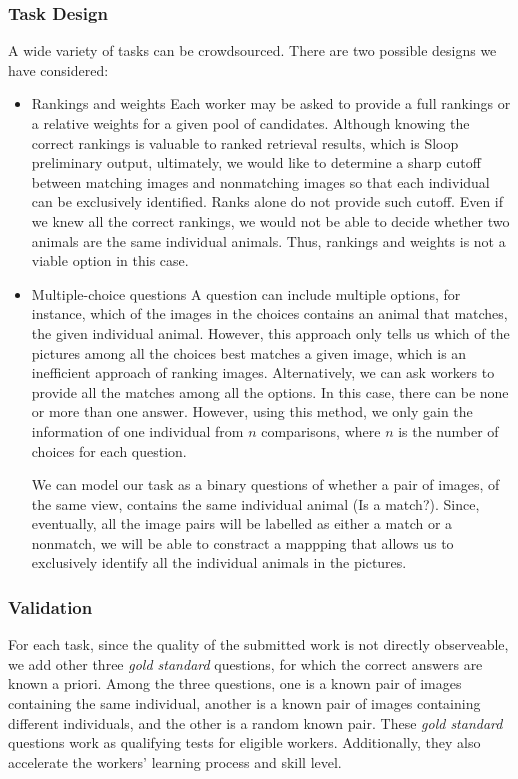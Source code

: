 \subsubsection{Task Design}
A wide variety of tasks can be crowdsourced. There are two possible designs we have considered:
\begin{itemize}
	\item Rankings and weights
	Each worker may be asked to provide a full rankings or a relative weights for a given pool of candidates. Although knowing the correct rankings is valuable to ranked retrieval results, which is Sloop preliminary output, ultimately, we would like to determine a sharp cutoff between matching images and nonmatching images so that each individual can be exclusively identified. Ranks alone do not provide such cutoff. Even if we knew all the correct rankings, we would not be able to decide whether two animals are the same individual animals. Thus, rankings and weights is not a viable option in this case.
	\item Multiple-choice questions
	A question can include multiple options, for instance, which of the images in the choices contains an animal that matches, the given individual animal. However, this approach only tells us which of the pictures among all the choices best matches a given image, which is an inefficient approach of ranking images. Alternatively, we can ask workers to provide all the matches among all the options. In this case, there can be none or more than one answer. However, using this method, we only gain the information of one individual from $n$ comparisons, where $n$ is the number of choices for each question.

	We can model our task as a binary questions of whether a pair of images, of the same view, contains the same individual animal (Is a match?). Since, eventually, all the image pairs will be labelled as either a match or a nonmatch, we will be able to constract a mappping that allows us to exclusively identify all the individual animals in the pictures.
\end{itemize}

\subsubsection{Validation}
\label{subsub:validation}

For each task, since the quality of the submitted work is not directly observeable, we add other three \emph{gold standard} questions, for which the correct answers are known a priori. Among the three questions, one is a known pair of images containing the same individual, another is a known pair of images containing different individuals, and the other is a random known pair. These \emph{gold standard} questions work as qualifying tests for eligible workers. Additionally, they also accelerate the workers' learning process and skill level.

